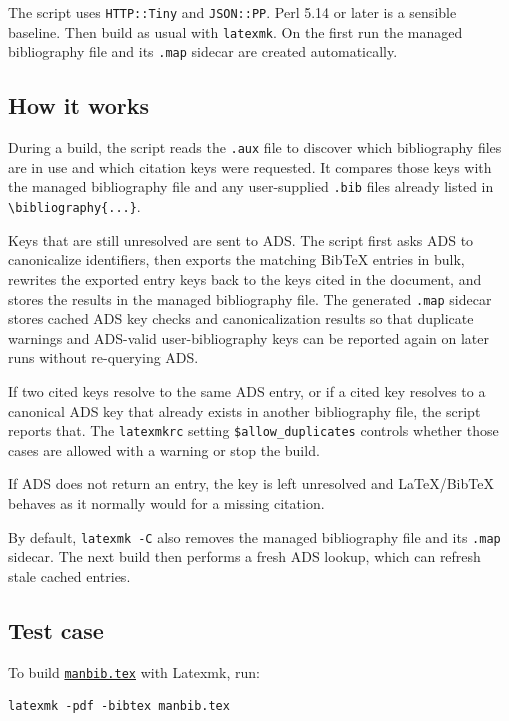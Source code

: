 The script uses \texttt{HTTP::Tiny} and \texttt{JSON::PP}. Perl 5.14 or
later is a sensible baseline. Then build as usual with \texttt{latexmk}.
On the first run the managed bibliography file and its \texttt{.map}
sidecar are created automatically.

\subsection{How it works}\label{how-it-works}

During a build, the script reads the \texttt{.aux} file to discover
which bibliography files are in use and which citation keys were
requested. It compares those keys with the managed bibliography file and
any user-supplied \texttt{.bib} files already listed in
\texttt{\textbackslash{}bibliography\{...\}}.

Keys that are still unresolved are sent to ADS. The script first asks
ADS to canonicalize identifiers, then exports the matching BibTeX
entries in bulk, rewrites the exported entry keys back to the keys cited
in the document, and stores the results in the managed bibliography
file. The generated \texttt{.map} sidecar stores cached ADS key checks
and canonicalization results so that duplicate warnings and ADS-valid
user-bibliography keys can be reported again on later runs without
re-querying ADS.

If two cited keys resolve to the same ADS entry, or if a cited key
resolves to a canonical ADS key that already exists in another
bibliography file, the script reports that. The \texttt{latexmkrc}
setting \texttt{\$allow\_duplicates} controls whether those cases are
allowed with a warning or stop the build.

If ADS does not return an entry, the key is left unresolved and
LaTeX/BibTeX behaves as it normally would for a missing citation.

By default, \texttt{latexmk\ -C} also removes the managed bibliography
file and its \texttt{.map} sidecar. The next build then performs a fresh
ADS lookup, which can refresh stale cached entries.

\subsection{Test case}\label{test-case}

To build \href{./manbib.tex}{\texttt{manbib.tex}} with Latexmk, run:

\begin{verbatim}
latexmk -pdf -bibtex manbib.tex
\end{verbatim}

